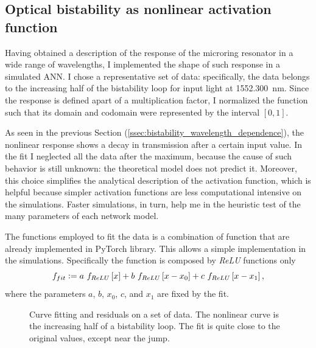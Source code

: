 \subsection{Optical bistability as nonlinear activation function}
\label{ssec:Optical_bistability_as_nonlinear_activation_function}
Having obtained a description of the response of the microring resonator in a wide range of wavelengths, I implemented the shape of such response in a simulated \ac{ANN}.
I chose a representative set of data: specifically, the data belongs to the increasing half of the bistability loop for input light at \SI{1552.300}{\nm}.
Since the response is defined apart of a multiplication factor, I normalized the function such that its domain and codomain were represented by the interval $[0,1]$.

As seen in the previous Section (\ref{ssec:bistability_wavelength_dependence}), the nonlinear response shows a decay in transmission after a certain input value.
In the fit I neglected all the data after the maximum, because the cause of such behavior is still unknown: the theoretical model does not predict it.
Moreover, this choice simplifies the analytical description of the activation function, which is helpful because simpler activation functions are less computational intensive on the simulations.
Faster simulations, in turn, help me in the heuristic test of the many parameters of each network model.

The functions employed to fit the data is a combination of function that are already implemented in PyTorch library.
This allows a simple implementation in the simulations.
Specifically the function is composed by \textit{ReLU} functions only
\begin{equation}
	f_{fit} \vcentcolon= a~f_{ReLU}\left[x\right]+b~f_{ReLU}\left[x-x_0\right]+c~f_{ReLU}\left[x-x_1\right],
	\label{eq:fit}
\end{equation}
where the parameters $a$, $b$, $x_0$, $c$, and $x_1$ are fixed by the fit.

%	
\begin{figure}[htbp]
	\centering
	
	\caption{Curve fitting and residuals on a set of data.
	The nonlinear curve is the increasing half of a bistability loop.
	The fit is quite close to the original values, except near the jump.}
	\label{fig:fit+residuals}
\end{figure}

